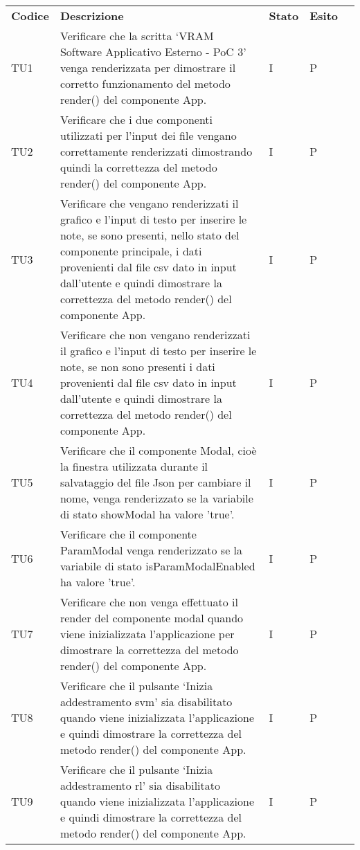 \begin{longtable} {
		>{}p{15mm} 
		>{}p{79.5mm}
		>{}p{15mm} 
		>{}p{15mm}
		>{}p{0mm}}
	\rowcolor{gray!50}
	\textbf{Codice} & \textbf{Descrizione} & \textbf{Stato} & \textbf{Esito} &\TBstrut \\
	TU1		    & Verificare che la scritta ‘VRAM Software Applicativo Esterno - PoC 3’ venga renderizzata per dimostrare il corretto funzionamento del metodo render() del componente App.& I & P &\TBstrut \\ [2mm]
	TU2			& Verificare che i due componenti utilizzati per l’input dei file vengano correttamente renderizzati dimostrando quindi la correttezza del metodo render() del componente App.& I & P &\TBstrut \\ [2mm]
	TU3			& Verificare che vengano renderizzati il grafico e l'input di testo per inserire le note, se sono presenti, nello stato del componente principale, i dati provenienti dal file csv dato in input dall'utente e quindi dimostrare la correttezza del metodo render() del componente App.& I & P &\TBstrut \\ [2mm]
	TU4			& Verificare che non vengano renderizzati il grafico e l’input di testo per inserire le note, se non sono presenti i dati provenienti dal file csv dato in input dall’utente e quindi dimostrare la correttezza del metodo render() del componente App.& I & P &\TBstrut \\ [2mm]
	TU5			& Verificare che il componente Modal, cioè la finestra utilizzata durante il salvataggio del file Json per cambiare il nome, venga renderizzato se la variabile di stato showModal ha valore 'true'.& I & P &\TBstrut \\ [2mm]
	TU6			& Verificare che il componente ParamModal  venga renderizzato se la variabile di stato isParamModalEnabled ha valore 'true'.& I & P &\TBstrut \\ [2mm]
	TU7			& Verificare che non venga effettuato il render del componente modal quando viene inizializzata l'applicazione per dimostrare la correttezza del metodo render() del componente App.& I & P &\TBstrut \\ [2mm]
	TU8			& Verificare che il pulsante ‘Inizia addestramento svm’ sia disabilitato quando viene inizializzata l’applicazione e quindi dimostrare la correttezza del metodo render() del componente App.& I & P &\TBstrut \\ [2mm]
	TU9			& Verificare che il pulsante ‘Inizia addestramento rl’ sia disabilitato quando viene inizializzata l’applicazione e quindi dimostrare la correttezza del metodo render() del componente App.& I & P &\TBstrut \\ [2mm]

\end{longtable}
